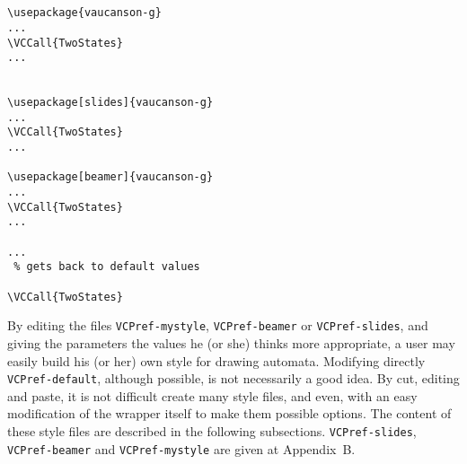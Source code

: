 \documentclass[11pt,twoside]{article}
\newlength{\parindenttemp} %
\newcommand{\noi}{\noindent}
\newlength{\jsIndent}%
\newlength{\ColSource}%
\newlength{\ColFigur}%
\begin{document}
\noi 
\hspace*{-\jsIndent}
\begin{minipage}[c]{\ColFigur+6em}%
\par\vspace*{0mm}%
\hspace*{1cm}
\begin{center}
%
%
\hspace*{-1cm}%
\\
\vspace*{.5cm}%
%
%
\\
\vspace*{.5cm}%


\end{center}
\end{minipage}%
\hspace*{1.2em}%
\begin{minipage}[c]{\ColSource-6em}
\setlength{\parindent}{\parindenttemp}%
\par\vspace*{0mm}%
\footnotesize
\begin{verbatim}
\usepackage{vaucanson-g}
...
\VCCall{TwoStates}
...


\usepackage[slides]{vaucanson-g}
...
\VCCall{TwoStates}
...

\usepackage[beamer]{vaucanson-g}
...
\VCCall{TwoStates}
...

...
 % gets back to default values

\VCCall{TwoStates}
\end{verbatim}
\normalsize
\end{minipage}%

\medskip 

\noi
By editing the files \texttt{VCPref-mystyle}, \texttt{VCPref-beamer} 
or \texttt{VCPref-slides}, and giving the  
parameters the values he (or she) thinks more appropriate, a user may 
easily build his (or her) own style for drawing automata. 
Modifying directly \texttt{VCPref-default}, although possible, is not 
necessarily a good idea.
By cut, editing and paste, it is not difficult create many style 
files, and even, with an easy modification of the wrapper 
itself to make them possible options.
The content of these style files are described in the following 
subsections. \texttt{VCPref-slides}, \texttt{VCPref-beamer}
and \texttt{VCPref-mystyle} are 
given at Appendix~B.
\end{document}
